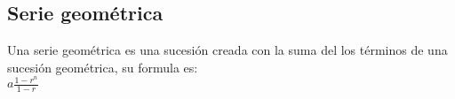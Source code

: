 \subsection{Serie geométrica}
Una serie geométrica es una sucesión creada con la suma del los términos de una sucesión geométrica, su formula es:
\\$a\frac{1-r^{n}}{1-r}$
